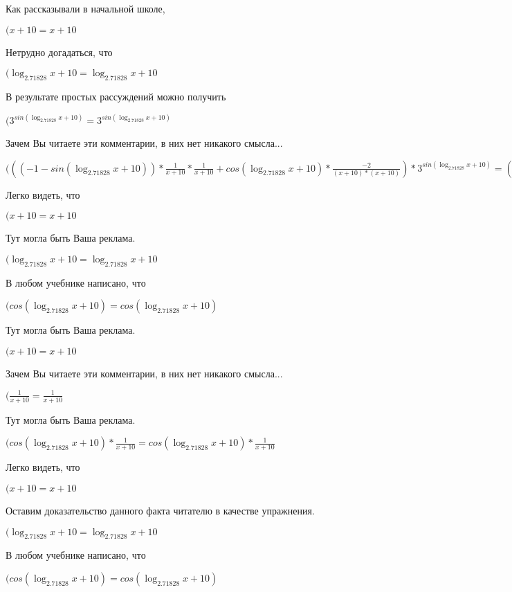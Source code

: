 \documentclass[12pt,a4paper,fleqn]{article}
\theoremstyle{definition}
\begin{document}
Как рассказывали в начальной школе,

$( x  +  10  =  x  +  10 $

Нетрудно догадаться, что

$(\log_{ 2.71828 }{ x  +  10 } = \log_{ 2.71828 }{ x  +  10 }$

В результате простых рассуждений можно получить

$({ 3 }^{sin(\log_{ 2.71828 }{ x  +  10 })} = { 3 }^{sin(\log_{ 2.71828 }{ x  +  10 })}$

Зачем Вы читаете эти комментарии, в них нет никакого смысла...

$((( -1  - sin(\log_{ 2.71828 }{ x  +  10 })) * \frac{ 1 }{ x  +  10 }
 * \frac{ 1 }{ x  +  10 }
 + cos(\log_{ 2.71828 }{ x  +  10 }) * \frac{ -2 }{( x  +  10 ) * ( x  +  10 )}
) * { 3 }^{sin(\log_{ 2.71828 }{ x  +  10 })} = (( -1  - sin(\log_{ 2.71828 }{ x  +  10 })) * \frac{ 1 }{ x  +  10 }
 * \frac{ 1 }{ x  +  10 }
 + cos(\log_{ 2.71828 }{ x  +  10 }) * \frac{ -2 }{( x  +  10 ) * ( x  +  10 )}
) * { 3 }^{sin(\log_{ 2.71828 }{ x  +  10 })}$

Легко видеть, что

$( x  +  10  =  x  +  10 $

Тут могла быть Ваша реклама.

$(\log_{ 2.71828 }{ x  +  10 } = \log_{ 2.71828 }{ x  +  10 }$

В любом учебнике написано, что

$(cos(\log_{ 2.71828 }{ x  +  10 }) = cos(\log_{ 2.71828 }{ x  +  10 })$

Тут могла быть Ваша реклама.

$( x  +  10  =  x  +  10 $

Зачем Вы читаете эти комментарии, в них нет никакого смысла...

$(\frac{ 1 }{ x  +  10 }
 = \frac{ 1 }{ x  +  10 }
$

Тут могла быть Ваша реклама.

$(cos(\log_{ 2.71828 }{ x  +  10 }) * \frac{ 1 }{ x  +  10 }
 = cos(\log_{ 2.71828 }{ x  +  10 }) * \frac{ 1 }{ x  +  10 }
$

Легко видеть, что

$( x  +  10  =  x  +  10 $

Оставим доказательство данного факта читателю в качестве упражнения.

$(\log_{ 2.71828 }{ x  +  10 } = \log_{ 2.71828 }{ x  +  10 }$

В любом учебнике написано, что

$(cos(\log_{ 2.71828 }{ x  +  10 }) = cos(\log_{ 2.71828 }{ x  +  10 })$
\end{document}
